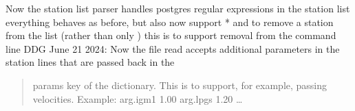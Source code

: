 \documentclass[letterpaper,10pt,english]{sphinxmanual}
\begin{document}

\begin{fulllineitems}
\label{\detokenize{classes:classes.Utils.process_date_str}}
\pysigstartsignatures
{}
\pysigstopsignatures
\end{fulllineitems}


\begin{fulllineitems}
\label{\detokenize{classes:classes.Utils.process_stnlist}}
\pysigstartsignatures
{}
\pysigstopsignatures
\sphinxAtStartPar
Now the station list parser handles postgres regular expressions in the station list
everything behaves as before, but also now support * and \sphinxhyphen{} to remove a station from the list (rather than only \sphinxhyphen{})
this is to support removal from the command line
DDG June 21 2024: Now the file read accepts additional parameters in the station lines that are passed back in the
\begin{quote}

\sphinxAtStartPar
params key of the dictionary. This is to support, for example, passing velocities. Example:
arg.igm1 1.00
arg.lpgs 1.20
…
\end{quote}

\end{fulllineitems}


\begin{fulllineitems}
\label{\detokenize{classes:classes.Utils.required_length}}
\pysigstartsignatures
{}
\pysigstopsignatures
\end{fulllineitems}
\end{document}
